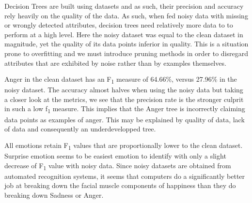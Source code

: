 Decision Trees are built using datasets and as such, their precision and accuracy rely heavily on the quality of the data.
As such, when fed noisy data with missing or wrongly detected attributes, decision trees need relatively more data to
to perform at a high level. Here the noisy dataset was equal to the clean dataset in magnitude, yet the quality of its data points
inferior in quality. This is a situation prone to overfitting and we must introduce pruning methods in order to disregard attributes
that are exhibited by noise rather than by examples themselves.

Anger in the clean dataset has an F\textsubscript{1} measure of 64.66\%, versus 27.96\% in the noisy dataset.
The accuracy almost halves when using the noisy data but taking a closer look at the metrics, we see that the precision
rate is the stronger culprit in such a low f\textsubscript{1} measure. This implies that the Anger tree is incorrectly claiming
data points as examples of anger. This may be explained by quality of data, lack of data and consequently an underdevelopped tree.

All emotions retain F\textsubscript{1} values that are proportionally lower to the clean dataset. 
Surprise emotion seems to be easiest emotion to identify with only a slight decrease of F\textsubscript{1} value with noisy data.
Since noisy datasets are obtained from automated recognition systems, it seems that computers do a significantly better job at
breaking down the facial muscle components of happiness than they do breaking down Sadness or Anger.
